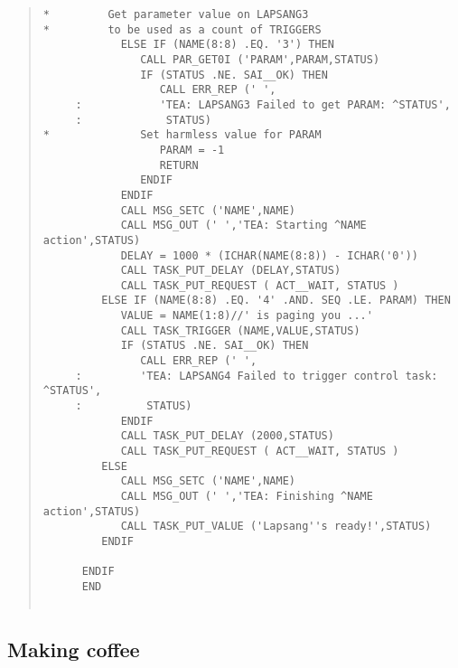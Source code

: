 \documentclass[twoside,11pt]{article}
\renewcommand{\_}{\texttt{\symbol{95}}}
\begin{document}
\begin{quote}
\begin{verbatim}
*         Get parameter value on LAPSANG3
*         to be used as a count of TRIGGERS
            ELSE IF (NAME(8:8) .EQ. '3') THEN
               CALL PAR_GET0I ('PARAM',PARAM,STATUS)
               IF (STATUS .NE. SAI__OK) THEN
                  CALL ERR_REP (' ',
     :            'TEA: LAPSANG3 Failed to get PARAM: ^STATUS',
     :             STATUS)
*              Set harmless value for PARAM
                  PARAM = -1
                  RETURN
               ENDIF
            ENDIF
            CALL MSG_SETC ('NAME',NAME)
            CALL MSG_OUT (' ','TEA: Starting ^NAME action',STATUS)
            DELAY = 1000 * (ICHAR(NAME(8:8)) - ICHAR('0'))
            CALL TASK_PUT_DELAY (DELAY,STATUS)
            CALL TASK_PUT_REQUEST ( ACT__WAIT, STATUS )
         ELSE IF (NAME(8:8) .EQ. '4' .AND. SEQ .LE. PARAM) THEN
            VALUE = NAME(1:8)//' is paging you ...'
            CALL TASK_TRIGGER (NAME,VALUE,STATUS)
            IF (STATUS .NE. SAI__OK) THEN
               CALL ERR_REP (' ',
     :         'TEA: LAPSANG4 Failed to trigger control task: ^STATUS',
     :          STATUS)
            ENDIF
            CALL TASK_PUT_DELAY (2000,STATUS)
            CALL TASK_PUT_REQUEST ( ACT__WAIT, STATUS )
         ELSE
            CALL MSG_SETC ('NAME',NAME)
            CALL MSG_OUT (' ','TEA: Finishing ^NAME action',STATUS)
            CALL TASK_PUT_VALUE ('Lapsang''s ready!',STATUS)
         ENDIF

      ENDIF
      END


\end{verbatim} \end{quote} \normalsize

\subsection{Making coffee}
\end{document}

